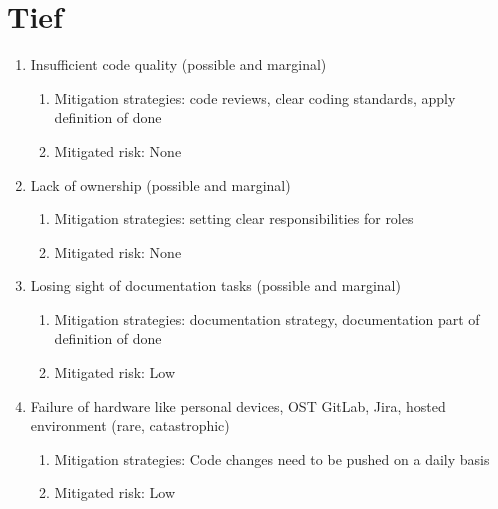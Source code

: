 \section{Tief}
\begin{enumerate}
    \item Insufficient code quality (possible and marginal) 
    \begin{enumerate}
        \item Mitigation strategies: code reviews, clear coding standards, apply definition of done
        \item Mitigated risk: None
    \end{enumerate}

    \item Lack of ownership (possible and marginal) 
    \begin{enumerate}
        \item Mitigation strategies: setting clear responsibilities for roles
        \item Mitigated risk: None
    \end{enumerate}

    \item Losing sight of documentation tasks (possible and marginal) 
    \begin{enumerate}
        \item Mitigation strategies: documentation strategy, documentation part of definition of done
        \item Mitigated risk: Low
    \end{enumerate}

    \item Failure of hardware like personal devices, OST GitLab, Jira, hosted environment (rare, catastrophic) 
    \begin{enumerate}
        \item Mitigation strategies: Code changes need to be pushed on a daily basis
        \item Mitigated risk: Low
    \end{enumerate}
\end{enumerate}